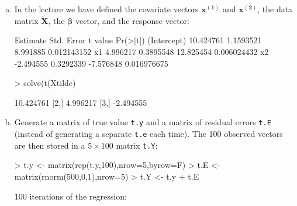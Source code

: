 \documentclass[a4paper,12pt]{scrartcl}
\begin{document}
\begin{enumerate}[a)]
\item In the lecture we have defined the covariate vectors $\bm{x^{(1)}}$ and $\bm{x^{(2)}}$, the data matrix $\bm{\tilde{X}}$, the $\bm\beta$ vector, and the response vector:
\begin{Schunk}
\begin{Soutput}
             Estimate Std. Error   t value    Pr(>|t|)
(Intercept) 10.424761  1.1593521  8.991885 0.012143152
x1           4.996217  0.3895548 12.825454 0.006024432
x2          -2.494555  0.3292339 -7.576848 0.016976675
\end{Soutput}
\begin{Sinput}
> solve(t(Xtilde) %*% Xtilde)  %*%  t(Xtilde) %*% t.Y
\end{Sinput}
\begin{Soutput}
          [,1]
[1,] 10.424761
[2,]  4.996217
[3,] -2.494555
\end{Soutput}
\end{Schunk}

\item Generate a matrix of true value \texttt{t.y} and a matrix of residual errors \texttt{t.E} (instead of generating a separate \texttt{t.e} each time). The 100 observed vectors are then stored in a $5$ matrix \texttt{t.Y}: 
\begin{Schunk}
\begin{Sinput}
> t.y <- matrix(rep(t.y,100),nrow=5,byrow=F)
> t.E <- matrix(rnorm(500,0,1),nrow=5)
> t.Y <- t.y  + t.E
\end{Sinput}
\end{Schunk}

100 iterations of the regression:
\begin{Schunk}
\end{Schunk}


\end{enumerate}
\end{document}
